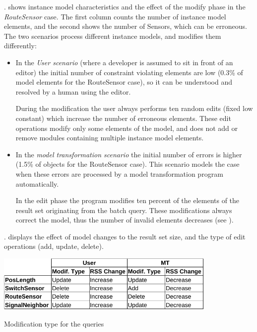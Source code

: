 . shows instance model characteristics and the effect of the modify phase in the \emph{RouteSensor} case. The first column counts the number of instance model elements, and the second shows the number of Sensors, which can be erroneous. The two scenarios process different instance models, and modifies them differently:

\begin{itemize}
\item 
In the \emph{User scenario} (where a developer is assumed to sit in front of an editor) the initial number of constraint violating elements are low (0.3\% of model elements for the RouteSensor case), so it can be understood and resolved by a human using the editor.

During the modification the user always performs ten random edits (fixed low constant) which increase the number of erroneous elements. These edit operations modify only some elements of the model, and does not add or remove modules containing multiple instance model elements.

\item 
In the \emph{model transformation scenario} the initial number of errors is higher (1.5\% of objects for the RouteSensor case). This scenario models the case when these errors are processed by a model transformation program automatically.

In the edit phase the program modifies ten percent of the elements of the result set originating from the batch query. These modifications always correct the model, thus the number of invalid elements decreases (see ).

\end{itemize}


. displays the effect of model changes to the result set size, and the type of edit operations (add, update, delete).

\begin{table}[h]
\centering
\includegraphics[width=0.8\textwidth]{figures/instance/modify_type-crop.pdf}
\caption{Modification type for the queries}
\label{table:modify_type}
\end{table}


